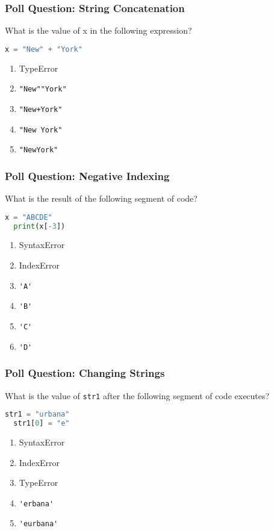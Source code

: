 \documentclass{beamer}
\begin{document}
%
%
\begin{frame}[fragile]
  \frametitle{Poll Question: String Concatenation}
  What is the value of x in the following expression?
  \begin{lstlisting}[language=Python, autogobble] 
  x = "New" + "York"
  \end{lstlisting}
  \vfill
  \begin{enumerate}[A] 
    \item TypeError
    \item \lstinline{"New""York"} 
    \item \lstinline{"New+York"} 
    \item \lstinline{"New York"} %
    \item \lstinline{"NewYork"} 
  \end{enumerate}
\end{frame}

%
%
\begin{frame}[fragile]
  \frametitle{Poll Question: Negative Indexing}
  What is the result of the following segment of code?
  \begin{lstlisting}[language=Python, autogobble] 
  x = "ABCDE"
  print(x[-3])
  \end{lstlisting}
  \vfill
  \begin{enumerate}[A] 
    \item SyntaxError
    \item IndexError
    \item \lstinline{'A'}
    \item \lstinline{'B'}
    \item \lstinline{'C'} %
    \item \lstinline{'D'}
  \end{enumerate}
\end{frame}

%
%
\begin{frame}[fragile]
  \frametitle{Poll Question: Changing Strings}
  What is the value of \lstinline|str1| after the following segment of code executes?
  \begin{lstlisting}[language=Python, autogobble] 
  str1 = "urbana"
  str1[0] = "e"
  \end{lstlisting}
  \vfill
  \begin{enumerate}[A] 
    \item SyntaxError
    \item IndexError
    \item TypeError %
    \item \lstinline{'erbana'}
    \item \lstinline{'eurbana'}
  \end{enumerate}
\end{frame}
\end{document}
